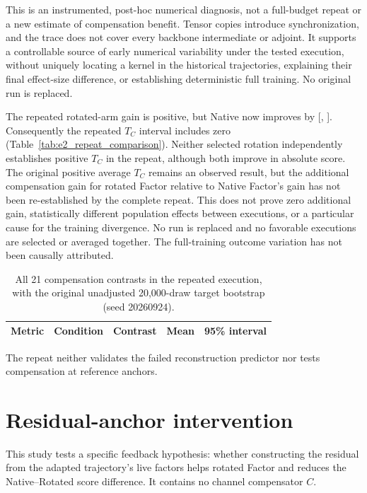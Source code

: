 This is an instrumented, post-hoc numerical diagnosis, not a full-budget
repeat or a new estimate of compensation benefit. Tensor copies introduce
synchronization, and the trace does not cover every backbone intermediate
or adjoint. It supports a controllable source of early numerical variability
under the tested execution, without uniquely locating a kernel in the
historical trajectories, explaining their final effect-size difference,
or establishing deterministic full training. No original run is replaced.

The repeated rotated-arm gain is positive, but Native now improves by
[, ].
Consequently the repeated $T_C$ interval includes zero
(Table~\ref{tab:e2_repeat_comparison}). Neither selected rotation independently
establishes positive $T_C$ in the repeat, although both improve in absolute
score. The original positive average $T_C$ remains an observed result, but
the additional compensation gain for rotated Factor relative to Native
Factor's gain has not been re-established by the complete repeat.
This does not prove zero additional gain, statistically
different population effects between executions, or a particular cause for
the training divergence. No run is replaced and no favorable executions are
selected or averaged together. The full-training outcome variation has not
been causally attributed.

\begin{table}[!htbp]\centering\footnotesize
\caption{All 21 compensation contrasts in the repeated execution, with the
original unadjusted 20,000-draw target bootstrap (seed 20260924).}
\label{tab:e2_repeat_all}
\begin{tabular}{lllll}\toprule
Metric & Condition & Contrast & Mean & 95\% interval \\\midrule

\end{tabular}\end{table}

The repeat neither validates the failed reconstruction predictor nor tests
compensation at reference anchors.




\clearpage
\section{Residual-anchor intervention}
\label{app:anchor_intervention}
This study tests a specific feedback hypothesis: whether constructing the
residual from the adapted trajectory's live factors helps rotated Factor and
reduces the Native--Rotated score difference. It contains no channel
compensator $C$.

